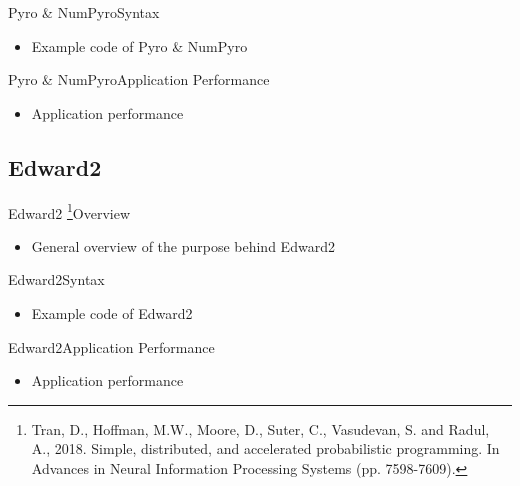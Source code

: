 \documentclass[AERbeamer%
              ,optEnglish%
              ,optBiber%
              ,optBibstyleAlphabetic%
              ,optBeamerClassicFormat%
              ]{AERlatex}%
\begin{document}
\begin{frame}[c]{Pyro \& NumPyro}{Syntax}
    \centering
    \begin{itemize}
        \item Example code of Pyro \& NumPyro
    \end{itemize}
\end{frame}


\begin{frame}[c]{Pyro \& NumPyro}{Application Performance}
    \centering
    \begin{itemize}
        \item Application performance
    \end{itemize}
\end{frame}


\subsection{Edward2}
\begin{frame}[c]{Edward2 \footnote{Tran, D., Hoffman, M.W., Moore, D., Suter, C., Vasudevan, S. and Radul, A., 2018. Simple, distributed,
                                   and accelerated probabilistic programming. In Advances in Neural Information Processing Systems (pp. 7598-7609).}}{Overview}
    \centering
    \begin{itemize}
        \item General overview of the purpose behind Edward2
    \end{itemize}
\end{frame}


\begin{frame}[c]{Edward2}{Syntax}
    \centering
    \begin{itemize}
        \item Example code of Edward2
    \end{itemize}
\end{frame}


\begin{frame}[c]{Edward2}{Application Performance}
    \centering
    \begin{itemize}
        \item Application performance
    \end{itemize}
\end{frame}
\end{document}
